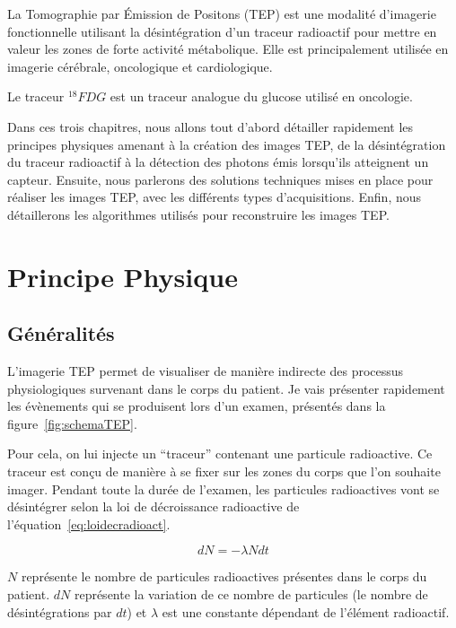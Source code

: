 
\label{lab:chapPET}
La Tomographie par \'Emission de Positons (TEP) est une modalité d'imagerie fonctionnelle utilisant la désintégration d'un traceur radioactif pour mettre en valeur les zones de forte activité métabolique. Elle est principalement utilisée en imagerie cérébrale, oncologique et cardiologique.

Le traceur $^{18}FDG$ est un traceur analogue du glucose utilisé en oncologie.

Dans ces trois chapitres, nous allons tout d'abord détailler rapidement les principes physiques amenant à la création des images TEP, de la désintégration du traceur radioactif à la détection des photons émis lorsqu'ils atteignent un capteur. Ensuite, nous parlerons des solutions techniques mises en place pour réaliser les images TEP, avec les différents types d'acquisitions. Enfin, nous détaillerons les algorithmes utilisés pour reconstruire les images TEP.

 
\chapter{Principe Physique}

	\section{Généralités}

L'imagerie TEP permet de visualiser de manière indirecte des processus physiologiques survenant dans le corps du patient. Je vais présenter rapidement les évènements qui se produisent lors d'un examen, présentés dans la figure~\ref{fig:schemaTEP}.

Pour cela, on lui injecte un ``traceur'' contenant une particule radioactive. Ce traceur est conçu de manière à se fixer sur les zones du corps que l'on souhaite imager. Pendant toute la durée de l'examen, les particules radioactives vont se désintégrer selon la loi de décroissance radioactive de l'équation~\ref{eq:loidecradioact}.

\begin{equation}
	dN = - \lambda N dt
	\label{eq:loidecradioact}
\end{equation}

$N$ représente le nombre de particules radioactives présentes dans le corps du patient. $dN$ représente la variation de ce nombre de particules (le nombre de désintégrations par $dt$) et $\lambda$ est une constante dépendant de l'élément radioactif.

